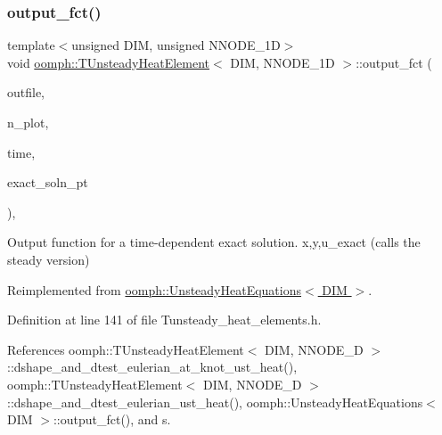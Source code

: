 \subsubsection{\texorpdfstring{output\+\_\+fct()}{output\_fct()}\hspace{0.1cm}{\footnotesize\ttfamily [2/2]}}
{\footnotesize\ttfamily template$<$unsigned D\+IM, unsigned N\+N\+O\+D\+E\+\_\+1D$>$ \\
void \hyperlink{classoomph_1_1TUnsteadyHeatElement}{oomph\+::\+T\+Unsteady\+Heat\+Element}$<$ D\+IM, N\+N\+O\+D\+E\+\_\+1D $>$\+::output\+\_\+fct (\begin{DoxyParamCaption}\item[{std\+::ostream \&}]{outfile,  }\item[{const unsigned \&}]{n\+\_\+plot,  }\item[{const double \&}]{time,  }\item[{\hyperlink{classoomph_1_1FiniteElement_ad4ecf2b61b158a4b4d351a60d23c633e}{Finite\+Element\+::\+Unsteady\+Exact\+Solution\+Fct\+Pt}}]{exact\+\_\+soln\+\_\+pt }\end{DoxyParamCaption})\hspace{0.3cm}{\ttfamily [inline]}, {\ttfamily [virtual]}}



Output function for a time-\/dependent exact solution. x,y,u\+\_\+exact (calls the steady version) 



Reimplemented from \hyperlink{classoomph_1_1UnsteadyHeatEquations_ab6f0a3d6afeec2fc0395f6185d91e588}{oomph\+::\+Unsteady\+Heat\+Equations$<$ D\+I\+M $>$}.



Definition at line 141 of file Tunsteady\+\_\+heat\+\_\+elements.\+h.



References oomph\+::\+T\+Unsteady\+Heat\+Element$<$ D\+I\+M, N\+N\+O\+D\+E\+\_\+D $>$\+::dshape\+\_\+and\+\_\+dtest\+\_\+eulerian\+\_\+at\+\_\+knot\+\_\+ust\+\_\+heat(), oomph\+::\+T\+Unsteady\+Heat\+Element$<$ D\+I\+M, N\+N\+O\+D\+E\+\_\+D $>$\+::dshape\+\_\+and\+\_\+dtest\+\_\+eulerian\+\_\+ust\+\_\+heat(), oomph\+::\+Unsteady\+Heat\+Equations$<$ D\+I\+M $>$\+::output\+\_\+fct(), and s.

\mbox{\label{classoomph_1_1TUnsteadyHeatElement_af3e705367ab5d37d0016ad00a8b81592}} 
